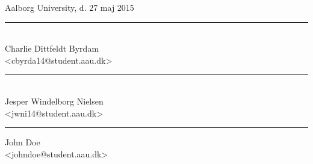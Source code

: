 \vspace{\baselineskip}\hfill Aalborg University, d. 27 maj 2015
\vfill\noindent
\begin{minipage}[b]{0.45\textwidth}
 \centering
 \rule{\textwidth}{0.5pt}\\
  Charlie Dittfeldt Byrdam\\
 {\footnotesize <cbyrda14@student.aau.dk>}
\end{minipage}
\hfill
\vspace{3\baselineskip}
\begin{minipage}[b]{0.45\textwidth}
 \centering
 \rule{\textwidth}{0.5pt}\\
  Jesper Windelborg Nielsen\\
 {\footnotesize <jwni14@student.aau.dk>}
\end{minipage}
\hfill
\vspace{3\baselineskip}
\begin{center}
\begin{minipage}[b]{0.45\textwidth}
 \centering
 \rule{\textwidth}{0.5pt}
  John Doe\\
 {\footnotesize <johndoe@student.aau.dk>}
\end{minipage}
\end{center}
